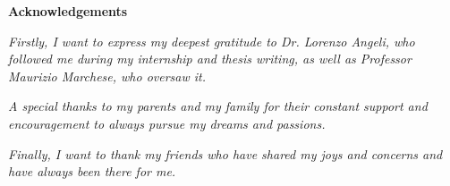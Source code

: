 \thispagestyle{empty}


\begin{center}
  {\bf \Huge Acknowledgements}
\end{center}

\vspace{4cm}
\emph{Firstly, I want to express my deepest gratitude to Dr. Lorenzo Angeli, who
followed me during my internship and thesis writing, as well as Professor Maurizio
Marchese, who oversaw it.}

\vspace{0.5cm}
\emph{A special thanks to my parents and my family for their constant support and
encouragement to always pursue my dreams and passions.}

\vspace{0.5cm}
\emph{Finally, I want to thank my friends who have shared my joys and concerns and
have always been there for me.}